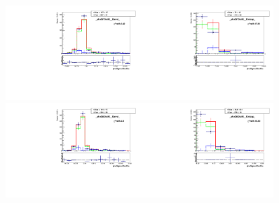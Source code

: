 \begin{figure}[htb]
  \begin{center}
   \includegraphics[width=0.45\textwidth]{../figs/figs_v11/MUON_WGamma/TemplateFits/c_TEMPL_SIHIH_UNblind__phoEt75to85__Barrel__RooFit.pdf}\includegraphics[width=0.45\textwidth]{../figs/figs_v11/MUON_WGamma/TemplateFits/c_TEMPL_SIHIH_UNblind__phoEt75to85__Endcap__RooFit.pdf}\\
   \includegraphics[width=0.45\textwidth]{../figs/figs_v11/MUON_WGamma/TemplateFits/c_TEMPL_SIHIH_UNblind__phoEt85to95__Barrel__RooFit.pdf}\includegraphics[width=0.45\textwidth]{../figs/figs_v11/MUON_WGamma/TemplateFits/c_TEMPL_SIHIH_UNblind__phoEt85to95__Endcap__RooFit.pdf}\\

\end{center}
\end{figure}
